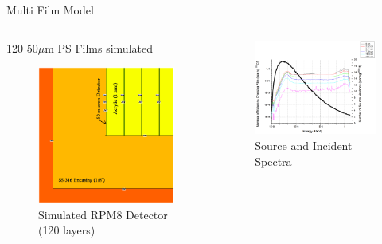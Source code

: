 \begin{frame}{Multi Film Model}
\begin{columns}[onlytextwidth]
\begin{column}{0.45\textwidth}
\small
120 50$\mu$m PS Films simulated
	\tiny
	\begin{figure}
		\centering
		\includegraphics[width=\textwidth]{images/Multi_120Layers.eps}
		\caption{Simulated RPM8 Detector (120 layers)}
	\end{figure}
\end{column}
\begin{column}{0.45\textwidth}
	\tiny
	\begin{figure}
		\centering
		\includegraphics[width=\textwidth]{images/Spectra_Layered.eps}
		\caption{Source and Incident Spectra}
	\end{figure}
\end{column}
\end{columns}
\end{frame}
